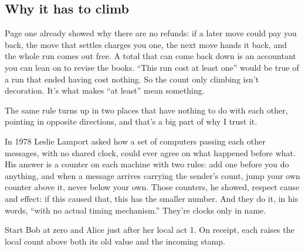 \documentclass[11pt,twoside]{article}
\theoremstyle{thielethm}
\theoremstyle{thieledef}
\theoremstyle{thieledef}
\theoremstyle{thieledef}
\theoremstyle{thielethm}
\theoremstyle{thieleobs}
\theoremstyle{thielethm}
\begin{document}
\subsection{Why it has to climb}

Page one already showed why there are no refunds: if a later move could pay you back, the move that settles charges you one, the next move hands it back, and the whole run comes out free. A total that can come back down is an accountant you can lean on to revise the books. ``This run cost at least one'' would be true of a run that ended having cost nothing. So the count only climbing isn't decoration. It's what makes ``at least'' mean something.

The same rule turns up in two places that have nothing to do with each other, pointing in opposite directions, and that's a big part of why I trust it.

In 1978 Leslie Lamport asked how a set of computers passing each other messages, with no shared clock, could ever agree on what happened before what. His answer is a counter on each machine with two rules: add one before you do anything, and when a message arrives carrying the sender's count, jump your own counter above it, never below your own. Those counters, he showed, respect cause and effect: if this caused that, this has the smaller number. And they do it, in his words, ``with no actual timing mechanism.'' They're clocks only in name.

\begin{center}

\small Start Bob at zero and Alice just after her local act 1. On receipt,
each raises the local count above both its old value and the incoming stamp.
\end{center}
\end{document}
